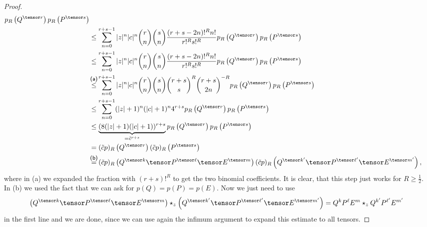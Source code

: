 \begin{proof}
\begin{align*}
        p_R \left(Q^{\tensor r} \right)
        p_R \left(P^{\tensor s} \right)
        \\
        & \leq
        \sum\limits_{n=0}^{r + s - 1}
        |z|^n |c|^n
        \binom{r}{n} \binom{s}{n}
        \frac{(r + s - 2n)!^R n!}{r!^R s!^R}
        p_R \left(Q^{\tensor r} \right)
        p_R \left(P^{\tensor s} \right)
        \\
        & \leq
        \sum\limits_{n=0}^{r + s - 1}
        |z|^n |c|^n
        \binom{r}{n} \binom{s}{n}
        \frac{(r + s - 2n)!^R n!}{r!^R s!^R}
        p_R \left(Q^{\tensor r} \right)
        p_R \left(P^{\tensor s} \right)
        \\
        & \ot{(a)}{\leq}
        \sum\limits_{n=0}^{r + s - 1}
        |z|^n |c|^n
        \binom{r}{n} \binom{s}{n}
        \binom{r + s}{s}^R
        \binom{r + s}{2n}^{-R}
        p_R \left(Q^{\tensor r} \right)
        p_R \left(P^{\tensor s} \right)
        \\
        & \leq
        \sum\limits_{n=0}^{r + s - 1}
        (|z| + 1)^n (|c| + 1)^n
        4^{r + s}
        p_R \left(Q^{\tensor r} \right)
        p_R \left(P^{\tensor s} \right)
        \\
        & \leq
        \underbrace{
        (8 (|z| + 1) (|c| + 1))^{r + s}
        }_{ = \tilde{c}^{r + s}}
        p_R \left(Q^{\tensor r} \right)
        p_R \left(P^{\tensor s} \right)
        \\
        & =
        (\tilde{c} p)_R \left(Q^{\tensor r} \right)
        (\tilde{c} p)_R \left(P^{\tensor s} \right)
        \\
        & \ot{(b)}{ = }
        (\tilde{c} p)_R \left(
        Q^{\tensor k} \tensor
        P^{\tensor \ell} \tensor
        E^{\tensor m} \right)
        (\tilde{c} p)_R \left(
        Q^{\tensor k'} \tensor
        P^{\tensor \ell'} \tensor
        E^{\tensor m'} \right),
    \end{align*}
    where in (a) we expanded the fraction with $(r + s)!^R$ to get the
    two binomial coefficients. It is clear, that this step just works
    for $R \geq \frac{1}{2}$.  In (b) we used the fact that we can ask
    for $p(Q) = p(P) = p(E)$. Now we just need to use
    \begin{equation*}
        \left(
        	Q^{\tensor k} \tensor
        	P^{\tensor \ell} \tensor
        	E^{\tensor m}
        \right)
        \ostar_z
        \left(
        	Q^{\tensor k'} \tensor
        	P^{\tensor \ell'} \tensor
        	E^{\tensor m'}
        \right)
        =
        Q^k P^{\ell} E^m
        \ostar_z
        Q^{k'} P^{\ell'} E^{m'}
    \end{equation*}
    in the first line and we are done, since we can use again the
    infimum argument to expand this estimate to all tensors.
\end{proof}



